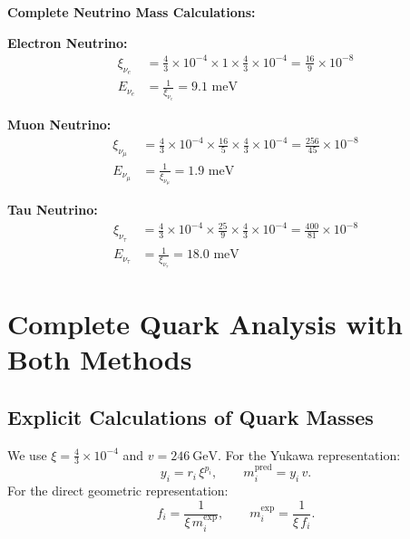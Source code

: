 	\textbf{Complete Neutrino Mass Calculations:}
	
	\textbf{Electron Neutrino:}
	\begin{align}
		\xi_{\nu_e} &= \frac{4}{3} \times 10^{-4} \times 1 \times \frac{4}{3} \times 10^{-4} = \frac{16}{9} \times 10^{-8} \\
		E_{\nu_e} &= \frac{1}{\xi_{\nu_e}} = 9.1 \text{ meV}
	\end{align}
	
	\textbf{Muon Neutrino:}
	\begin{align}
		\xi_{\nu_\mu} &= \frac{4}{3} \times 10^{-4} \times \frac{16}{5} \times \frac{4}{3} \times 10^{-4} = \frac{256}{45} \times 10^{-8} \\
		E_{\nu_\mu} &= \frac{1}{\xi_{\nu_\mu}} = 1.9 \text{ meV}
	\end{align}
	
	\textbf{Tau Neutrino:}
	\begin{align}
		\xi_{\nu_\tau} &= \frac{4}{3} \times 10^{-4} \times \frac{25}{9} \times \frac{4}{3} \times 10^{-4} = \frac{400}{81} \times 10^{-8} \\
		E_{\nu_\tau} &= \frac{1}{\xi_{\nu_\tau}} = 18.0 \text{ meV}
	\end{align}
	
	\section{Complete Quark Analysis with Both Methods}
	\label{sec:quark_analysis}
	
	\subsection{Explicit Calculations of Quark Masses}
	\label{subsec:quark_calculations}
	
	We use $\xi=\tfrac{4}{3}\times10^{-4}$ and $v=246\ \mathrm{GeV}$.
	For the Yukawa representation:
	\[
	y_i = r_i\,\xi^{p_i},\qquad m_i^{\text{pred}}=y_i\,v.
	\]
	For the direct geometric representation:
	\[
	f_i=\frac{1}{\xi\, m_i^{\text{exp}}},\qquad m_i^{\text{exp}}=\frac{1}{\xi\, f_i}.
	\]
	
